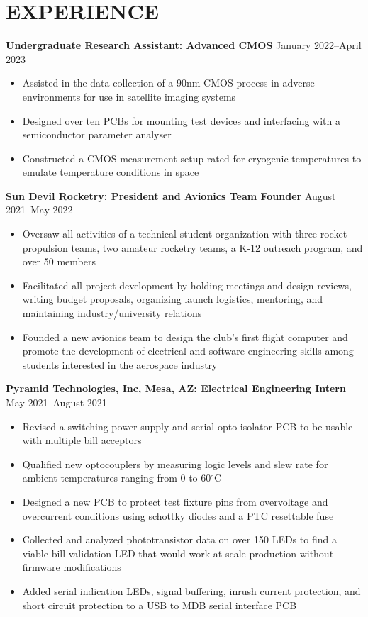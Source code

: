 \documentclass{article}
\begin{document}
\section{EXPERIENCE}
\textbf{Undergraduate Research Assistant: Advanced CMOS}
\hfill
\vspace{0.5em}
January 2022--April 2023
\begin{itemize}
\item{Assisted in the data collection of a 90nm CMOS process in adverse environments for use in satellite imaging systems}
\item{Designed over ten PCBs for mounting test devices and interfacing with a semiconductor parameter analyser}
\item{Constructed a CMOS measurement setup rated for cryogenic temperatures to emulate temperature conditions in space}
\end{itemize}
\vspace{1em}
\textbf{Sun Devil Rocketry: President and Avionics Team Founder}
\hfill
\vspace{0.5em}
August 2021--May 2022
\begin{itemize}
\item{Oversaw all activities of a technical student organization with three rocket propulsion teams, two amateur rocketry teams, a K-12 outreach program, and over 50 members   }
\item{Facilitated all project development by holding meetings and design reviews, writing budget proposals, organizing launch logistics, mentoring, and maintaining industry/university relations}
\item{Founded a new avionics team to design the club's first flight computer and promote the development of electrical and software engineering skills among students interested in the aerospace industry}
\vspace{1em}
\end{itemize}
\textbf{Pyramid Technologies, Inc, Mesa, AZ: Electrical Engineering Intern}
\hfill 
\vspace{0.5em}
May 2021--August 2021
\begin{itemize}
\item{Revised a switching power supply and serial opto-isolator PCB to be usable with multiple bill acceptors}
\item{Qualified new optocouplers by measuring logic levels and slew rate for ambient temperatures ranging from 0 to 60$^{\circ}$C}
\item{Designed a new PCB to protect test fixture pins from overvoltage and overcurrent conditions
	using schottky diodes and a PTC resettable fuse}
\item{Collected and analyzed phototransistor data on over 150 LEDs to find a viable bill validation
	LED that would work at scale production without firmware modifications}
\item{Added serial indication LEDs, signal buffering, inrush current protection, and short circuit protection to a USB to MDB serial interface PCB}
\end{itemize}
\end{document}
